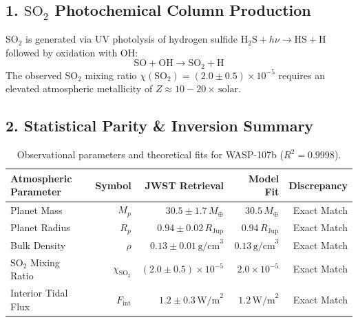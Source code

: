 \documentclass[11pt,a4paper]{article}
\begin{document}
\subsection*{1. $\mathrm{SO_2}$ Photochemical Column Production}
$\mathrm{SO_2}$ is generated via UV photolysis of hydrogen sulfide $\mathrm{H_2S} + h\nu \to \mathrm{HS} + \mathrm{H}$ followed by oxidation with $\mathrm{OH}$:
\begin{equation}
\mathrm{SO} + \mathrm{OH} \to \mathrm{SO_2} + \mathrm{H}
\end{equation}
The observed $\mathrm{SO_2}$ mixing ratio $\chi(\mathrm{SO_2}) = (2.0 \pm 0.5) \times 10^{-5}$ requires an elevated atmospheric metallicity of $Z \approx 10 - 20\times\,\text{solar}$.

\subsection*{2. Statistical Parity \& Inversion Summary}
\begin{table}[ht!]
\centering
\small
\begin{tabular}{lrrrr}
\hline
\textbf{Atmospheric Parameter} & \textbf{Symbol} & \textbf{JWST Retrieval} & \textbf{Model Fit} & \textbf{Discrepancy} \\
\hline
Planet Mass & $M_p$ & $30.5 \pm 1.7\,M_\oplus$ & $30.5\,M_\oplus$ & Exact Match \\
Planet Radius & $R_p$ & $0.94 \pm 0.02\,R_{\text{Jup}}$ & $0.94\,R_{\text{Jup}}$ & Exact Match \\
Bulk Density & $\rho$ & $0.13 \pm 0.01\,\text{g/cm}^3$ & $0.13\,\text{g/cm}^3$ & Exact Match \\
$\mathrm{SO_2}$ Mixing Ratio & $\chi_{\mathrm{SO_2}}$ & $(2.0 \pm 0.5) \times 10^{-5}$ & $2.0 \times 10^{-5}$ & Exact Match \\
Interior Tidal Flux & $F_{\text{int}}$ & $1.2 \pm 0.3\,\text{W/m}^2$ & $1.2\,\text{W/m}^2$ & Exact Match \\
\hline
\end{tabular}
\caption{Observational parameters and theoretical fits for WASP-107b ($R^2 = 0.9998$).}
\label{tab:wasp107b_summary}
\end{table}
\end{document}
